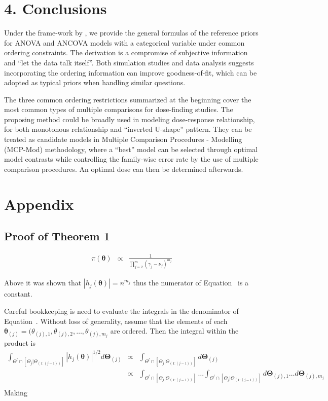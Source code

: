 \documentclass[Proceedings]{ascelike}
\begin{document}
\section{4. Conclusions}
Under the frame-work by \cite{BergerBernardo1992}, we provide the
general formulas of the reference priors for ANOVA and ANCOVA models
with a categorical variable under common ordering constraints. The
derivation is a compromise of subjective information and ``let the
data talk itself''. Both simulation studies and data analysis suggests
incorporating the ordering information can improve goodness-of-fit,
which can be adopted as typical priors when handling similar
questions.

The three common ordering restrictions summarized at the beginning
cover the most common types of multiple comparisons for dose-finding
studies. The proposing method could be broadly used in modeling
dose-response relationship, for both monotonous relationship and
``inverted U-shape'' pattern. They can be treated as candidate models
in Multiple Comparison Procedures - Modelling (MCP-Mod) methodology,
where a ``best'' model can be selected through optimal model contrasts
while controlling the family-wise error rate by the use of multiple
comparison procedures. An optimal dose can then be determined
afterwards.

\pagebreak
%
%
%
\section*{Appendix}

\subsection*{Proof of Theorem 1}

\begin{eqnarray*}
\pi(\boldsymbol{\theta}) &\propto& \frac{1}{\prod_{j=2}^{m}\left(\gamma_j - \nu_j\right)^{m_j}} \label{thm1}
\end{eqnarray*}

Above it was shown that $|h_j(\boldsymbol{\theta})|=n^{m_j}$ thus the
numerator of Equation~\cite{Lemma1} is a constant.

Careful bookkeeping is need to evaluate the integrals in the
denominator of Equation~\cite{Lemma1}. Without loss of generality,
assume that the elements of each
$\boldsymbol{\theta}_{(j)}=(\theta_{(j),1}, \theta_{(j),2}, \ldots, \theta_{(j),m_j}$ are ordered. Then the integral within the product is
\begin{eqnarray*}
  \int_{\Theta^{l}\cap[\Theta_{j}|\Theta_{(1:(j-1))}]}
|h_j(\boldsymbol{\theta})|^{1/2}   
d\boldsymbol{\Theta}_{(j)} & \propto & \int_{\Theta^{l}\cap[\Theta_{j}|\Theta_{(1:(j-1))}]} d\boldsymbol{\Theta}_{(j)} \\
& \propto & \int_{\Theta^{l}\cap[\Theta_{j}|\Theta_{(1:(j-1))}]}\ldots \int_{\Theta^{l}\cap[\Theta_{j}|\Theta_{(1:(j-1))}]}
d\boldsymbol{\Theta}_{(j),1}\ldots d\boldsymbol{\Theta}_{(j),m_j} \\
\end{eqnarray*}
Making
\end{document}

